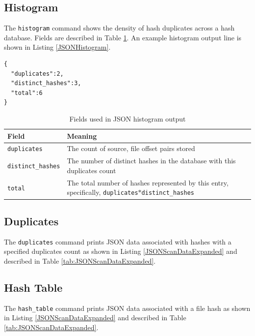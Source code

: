 \documentclass[11pt,fleqn]{article} %
\begin{document}
\subsection{Histogram}
\label{Histogram}
The \verb+histogram+ command shows the density of hash duplicates across a hash database. Fields are described in Table \ref{tab:JSONHistogram}. An example histogram output line is shown in Listing \ref{JSONHistogram}.

\lstset{style=customfile}
\begin{lstlisting}[float, caption={Example JSON histogram format}, label=JSONHistogram]
{
  "duplicates":2,
  "distinct_hashes":3,
  "total":6
}
\end{lstlisting}

\begin{table}[!ht]

\centering
\caption{Fields used in JSON histogram output}
\label{tab:JSONHistogram}
\begin{tabular}{|p{5 cm}|p{8.8 cm}|}
\hline \hline
\textbf{Field} & \textbf{Meaning} \\
\hline
\verb+duplicates+ & The count of source, file offset pairs stored\\
\hline
\verb+distinct_hashes+ & The number of distinct hashes in the database with this duplicates count\\
\hline
\verb+total+ & The total number of hashes represented by this entry, specifically, \verb+duplicates+$*$\verb+distinct_hashes+\\
\hline
\end{tabular}
\end{table}

\subsection{Duplicates}
The \verb+duplicates+ command prints JSON data associated with hashes with a specified duplicates count as shown in Listing \ref{JSONScanDataExpanded} and described in Table \ref{tab:JSONScanDataExpanded}.\\

\subsection{Hash Table}
The \verb+hash_table+ command prints JSON data associated with a file hash as shown in Listing \ref{JSONScanDataExpanded} and described in Table \ref{tab:JSONScanDataExpanded}.\\
\end{document}
